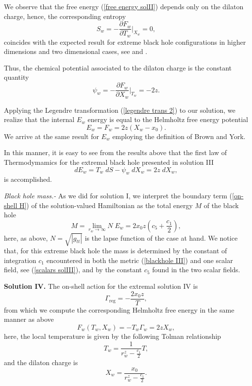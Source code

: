 \documentclass[sn-mathphys,Numbered]{sn-jnl}%
\theoremstyle{thmstyleone}%
\theoremstyle{thmstyletwo}%
\theoremstyle{thmstylethree}%
\begin{document}
We observe that the free energy (\ref{free energy solII}) depends only on the dilaton charge, hence, the corresponding entropy 
\begin{equation}\label{entropy III}
    S_w=-\frac{\partial F_w}{\partial T_w}\bigg\rvert_{X_w}=0,
\end{equation}
coincides with the expected result for extreme black hole configurations in higher dimensions and two dimensional cases, see \cite{Hawking2} and \cite{Kumar}.

Thus, the chemical potential associated to the dilaton charge is the constant quantity 
%
\begin{equation}\label{chemical potential III}
    \psi_w=-\frac{\partial F_w}{\partial X_w}\bigg\rvert_{T_w}=-2z.
\end{equation}

Applying the Legendre transformation (\ref{legendre trans 2}) to our solution, we realize that the internal $E_w$ energy is equal to the Helmholtz free energy potential
%
\begin{equation}
    E_w=F_w=2z\left(X_w-x_0\right).
\end{equation}
%
We arrive at the same result for $E_w$ employing the definition of Brown and York.

In this manner, it is easy to see from the results above that the first law of Thermodymamics for the extremal black hole presented in solution III 
%
\begin{equation}
    dE_w=T_w\;dS-\psi_w\;dX_w=2z\;dX_w,
\end{equation}
is accomplished. 

\textit{Black hole mass.-} As we did for solution I, we interpret the boundary term (\ref{on-shell H}) of the solution-valued Hamiltonian as the total energy $M$ of the black hole
%
\begin{equation}
    M= \lim_{r_w \rightarrow \infty} N\; E_w =2x_0 z \left(c_5+ \frac{c_1}{2}\right),   
\end{equation}
here, as above, $N=\sqrt{|g_{tt}|}$ is the lapse function of the case at hand. We notice that, for this extreme black hole the mass is determined by the constant of integration $c_1$ encountered in both the metric (\ref{blackhole III}) and one scalar field, see (\ref{scalars solIII}), and by the constant $c_5$ found in the two scalar fields.

\textbf{Solution IV.}
The on-shell action for the extremal solution IV is
\begin{equation}
    \Gamma_{\text{reg}}=-\frac{2x_0 z}{T}, 
\end{equation}
%
from which we compute the corresponding Helmholtz free energy in the same manner as above
%
\begin{equation}
    F_w(T_w,X_w)=-T_w \Gamma_w=2zX_w,
\end{equation}
%
here, the local temperature is given by the following Tolman relationship
%
\begin{equation}
    T_w=\frac{1}{r_w^z-\frac{c_1}{2}} T,
\end{equation}
and the dilaton charge is
\begin{equation}
    X_w= \frac{x_0}{r_w^z-\frac{c_1}{2}}.
\end{equation}
\end{document}
